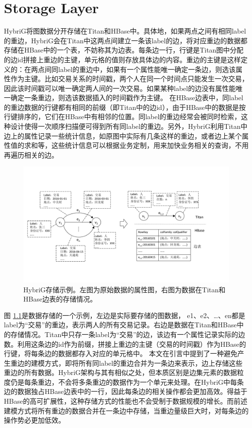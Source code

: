 
\chapter{Storage Layer}
HybriG将图数据分开存储在Titan和HBase中。具体地，如果两点之间有相同label的重边，HybriG会在Titan中这两点间建立一条该label的边，将对应重边的数据都存储在HBase中的一个表，不妨称其为边表。每条边一行，行键是Titan图中分配的边id拼接上重边的主键，单元格的值则存放具体边的内容。重边的主键是这样定义的：在两点间同label的重边中，如果有一个属性能唯一确定一条边，则选该属性作为主键。比如交易关系的时间戳，两个人在同一个时间点只能发生一次交易，因此该时间戳可以唯一确定两人间的一次交易。如果某种label的边没有属性能唯一确定一条重边，则选该数据插入的时间戳作为主键。
在HBase边表中，同label的重边数据的行键都有相同的前缀（即Titan中的边id），由于HBase中的数据是按行键排序的，它们在HBase中有相邻的位置。同label的重边经常会被同时检索，这种设计使得一次顺序扫描便可得到所有同label的重边。另外，HybriG利用Titan中边上的属性记录一些统计信息，如原图中实际有几条这样的重边，或者边上某个属性值的求和等，这些统计信息可以根据业务定制，用来加快业务相关的查询，不用再遍历相关的边。

\begin{figure}[htbp]
\centering
\includegraphics[width=150mm]{fig/storage_layer.pdf}
\caption{HybriG存储示例。左图为原始数据的属性图，右图为数据在Titan和HBase边表的存储情况。}
\label{fig:storage_layer}
\end{figure}

图 \ref{fig:storage_layer}是数据存储的一个示例，左边是实际要存储的图数据， e1、e2、…、en都是label为“交易”的重边，表示两人的所有交易记录。右边是数据在Titan和HBase中的存储情况。Titan中只存一条label为“交易”的边，该边有一个属性记录实际的边数。利用这条边的id作为前缀，拼接上重边的主键（交易的时间戳）作为HBase的行键，将每条边的数据都存入对应的单元格中。
本文在引言中提到了一种避免产生重边的建模方式，即将所有同label的重边合并为一条边来表示，边上存储这些重边的所有数据。HybriG架构与其有相似之处，但本质区别是边集元素的数据粒度仍是每条重边，不会将多条重边的数据作为一个单元来处理。在HybriG中每条边的数据独占HBase边表中的一行，因此每条边的相关操作都会更加高效。得益于HBase的高可扩展性，这种存储方式的性能也不会受制于数据规模的增长。而前述建模方式将所有重边的数据合并在一条边中存储，当重边量级巨大时，对每条边的操作势必更加低效。


